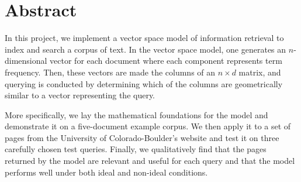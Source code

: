 \section{Abstract} \label{sec:abstract}

In this project, we implement a vector space model of information retrieval to index and search a corpus of text. In the vector space model, one generates an \(n\)-dimensional vector for each document where each component represents term frequency. Then, these vectors are made the columns of an $n\times d$ matrix, and querying is conducted by determining which of the columns are geometrically similar to a vector representing the query.


More specifically, we lay the mathematical foundations for the model and demonstrate it on a five-document example corpus. We then apply it to a set of pages from the University of Colorado-Boulder's website and test it on three carefully chosen test queries. Finally, we qualitatively find that the pages returned by the model are relevant and useful for each query and that the model performs well under both ideal and non-ideal conditions.

